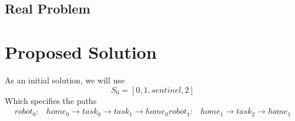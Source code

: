 \documentclass[a4paper]{article}
\begin{document}
\subsection{Real Problem}



\section{Proposed Solution}

As an initial solution, we will use
$$S_0 = [0, 1, \mathit{sentinel}, 2 ]$$
Which specifies the paths
\begin{align*}
\mathit{robot}_0: & \mathit{home}_0 \rightarrow \mathit{task}_0 \rightarrow \mathit{task}_1 \rightarrow  \mathit{home}_0
\mathit{robot}_1: & \mathit{home}_1 \rightarrow \mathit{task}_2 \rightarrow \mathit{home}_1
\end{align*}





\end{document}

